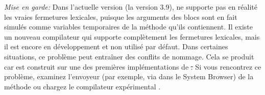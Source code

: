 \documentclass[a4paper,10pt,twoside]{book}
\begin{document}

\emph{Mise en garde:} Dans l'actuelle version (la version 3.9), \sq ne supporte pas en r\'{e}alit\'{e} les vraies fermetures lexicales, puisque les arguments des blocs sont en fait simul\'{e}s comme variables temporaires de la m\'{e}thode qu'ils contiennent. Il existe un nouveau compilateur qui supporte compl\`{e}tement les fermetures lexicales, mais il est encore en d\'{e}veloppement et non utilis\'{e} par d\'{e}faut.
Dans certaines situations, ce probl\`{e}me peut entraîner des conflits de nommage. Cela se produit car \sq est construit sur une des premi\`{e}res impl\'{e}mentations de \st.
Si vous rencontrez ce probl\`{e}me, examinez l'envoyeur 
(par exemple, via  dans le System Browser)
de la m\'{e}thode  ou chargez le
compilateur 
expérimental .






\end{document}
